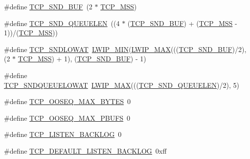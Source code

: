 \begin{DoxyCompactItemize}
\#define \hyperlink{group__lwip__opts__tcp_ga871d111968d8c6c7880ff36b93c5c4dd}{T\+C\+P\+\_\+\+S\+N\+D\+\_\+\+B\+UF}~(2 $\ast$ \hyperlink{group__lwip__opts__tcp_gaf1ab7bb27860aa3677c387a2f3ba317b}{T\+C\+P\+\_\+\+M\+SS})
\item 
\#define \hyperlink{group__lwip__opts__tcp_ga9beaa47832ead4180981bfbf71074904}{T\+C\+P\+\_\+\+S\+N\+D\+\_\+\+Q\+U\+E\+U\+E\+L\+EN}~((4 $\ast$ (\hyperlink{openmote-cc2538_2lwip_2test_2unit_2lwipopts_8h_a871d111968d8c6c7880ff36b93c5c4dd}{T\+C\+P\+\_\+\+S\+N\+D\+\_\+\+B\+UF}) + (\hyperlink{group__lwip__opts__tcp_gaf1ab7bb27860aa3677c387a2f3ba317b}{T\+C\+P\+\_\+\+M\+SS} -\/ 1))/(\hyperlink{group__lwip__opts__tcp_gaf1ab7bb27860aa3677c387a2f3ba317b}{T\+C\+P\+\_\+\+M\+SS}))
\item 
\#define \hyperlink{group__lwip__opts__tcp_gae5c9866d7cd463ac7b36792182145aec}{T\+C\+P\+\_\+\+S\+N\+D\+L\+O\+W\+AT}~\hyperlink{openmote-cc2538_2lwip_2src_2include_2lwip_2def_8h_a748f5df614a3fc989e8900fd229d6e4e}{L\+W\+I\+P\+\_\+\+M\+IN}(\hyperlink{openmote-cc2538_2lwip_2src_2include_2lwip_2def_8h_a21ea174d374106caeafb4aa3a24fbd2b}{L\+W\+I\+P\+\_\+\+M\+AX}(((\hyperlink{openmote-cc2538_2lwip_2test_2unit_2lwipopts_8h_a871d111968d8c6c7880ff36b93c5c4dd}{T\+C\+P\+\_\+\+S\+N\+D\+\_\+\+B\+UF})/2), (2 $\ast$ \hyperlink{group__lwip__opts__tcp_gaf1ab7bb27860aa3677c387a2f3ba317b}{T\+C\+P\+\_\+\+M\+SS}) + 1), (\hyperlink{openmote-cc2538_2lwip_2test_2unit_2lwipopts_8h_a871d111968d8c6c7880ff36b93c5c4dd}{T\+C\+P\+\_\+\+S\+N\+D\+\_\+\+B\+UF}) -\/ 1)
\item 
\#define \hyperlink{group__lwip__opts__tcp_ga75659867592a6b01c198532ed1b65698}{T\+C\+P\+\_\+\+S\+N\+D\+Q\+U\+E\+U\+E\+L\+O\+W\+AT}~\hyperlink{openmote-cc2538_2lwip_2src_2include_2lwip_2def_8h_a21ea174d374106caeafb4aa3a24fbd2b}{L\+W\+I\+P\+\_\+\+M\+AX}(((\hyperlink{openmote-cc2538_2lwip_2test_2unit_2lwipopts_8h_a9beaa47832ead4180981bfbf71074904}{T\+C\+P\+\_\+\+S\+N\+D\+\_\+\+Q\+U\+E\+U\+E\+L\+EN})/2), 5)
\item 
\#define \hyperlink{group__lwip__opts__tcp_ga9d6d3219bb5fc0bc760a64114de13c25}{T\+C\+P\+\_\+\+O\+O\+S\+E\+Q\+\_\+\+M\+A\+X\+\_\+\+B\+Y\+T\+ES}~0
\item 
\#define \hyperlink{group__lwip__opts__tcp_ga1f57d3859c4556f785708e5dc440617e}{T\+C\+P\+\_\+\+O\+O\+S\+E\+Q\+\_\+\+M\+A\+X\+\_\+\+P\+B\+U\+FS}~0
\item 
\#define \hyperlink{group__lwip__opts__tcp_ga98b23e7cbd3281915c50a485cb61899d}{T\+C\+P\+\_\+\+L\+I\+S\+T\+E\+N\+\_\+\+B\+A\+C\+K\+L\+OG}~0
\item 
\#define \hyperlink{group__lwip__opts__tcp_ga93cce3f47e33df11248c908d1775bacf}{T\+C\+P\+\_\+\+D\+E\+F\+A\+U\+L\+T\+\_\+\+L\+I\+S\+T\+E\+N\+\_\+\+B\+A\+C\+K\+L\+OG}~0xff

\end{DoxyCompactItemize}
